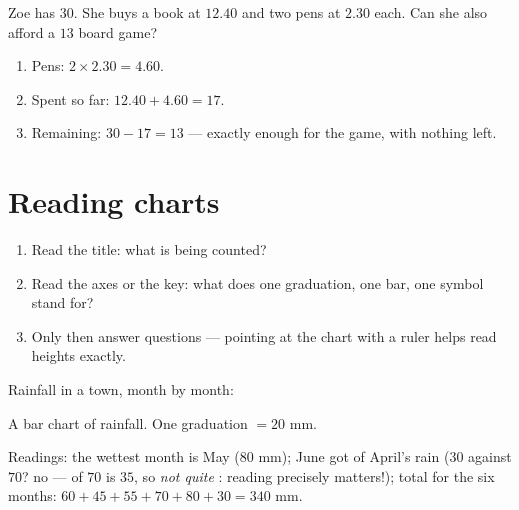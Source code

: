 \begin{example}\label{ex:g5:data:budget}
Zoe has $30$. She buys a book at $12.40$ and two pens at $2.30$
each. Can she also afford a $13$ board game?
\begin{enumerate}
  \item Pens: $2 \times 2.30 = 4.60$.
  \item Spent so far: $12.40 + 4.60 = 17$.
  \item Remaining: $30 - 17 = 13$ --- exactly enough for the game,
        with nothing left.
\end{enumerate}
\end{example}

\section{Reading charts}

\begin{method}\label{met:g5:data:read}
\begin{enumerate}
  \item Read the title: what is being counted?
  \item Read the axes or the key: what does one graduation, one bar,
        one symbol stand for?
  \item Only then answer questions --- pointing at the chart with a
        ruler helps read heights exactly.
\end{enumerate}
\end{method}

\begin{example}\label{ex:g5:data:chart}
Rainfall in a town, month by month:

\begin{omfigure}

{\small A bar chart of rainfall. One graduation $= 20$ mm.}
\end{omfigure}

Readings: the wettest month is May ($80$ mm); June got  of
April's rain ($30$ against $70$? no ---  of $70$ is $35$, so
\emph{not quite} : reading precisely matters!); total for the
six months: $60 + 45 + 55 + 70 + 80 + 30 = 340$ mm.
\end{example}

